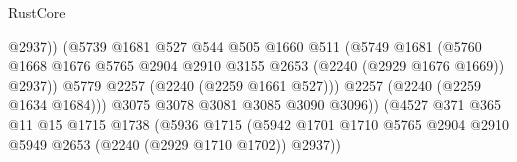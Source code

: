 \begin{lexlean}{RustCore}
\begin{coremodule}
                                                @2937))
                                            (@5739
                                              @1681
                                              @527
                                              @544
                                              @505
                                              @1660
                                              @511
                                              (@5749
                                                @1681
                                                (@5760
                                                  @1668
                                                  @1676
                                                  @5765
                                                  @2904
                                                  @2910
                                                  @3155
                                                  @2653
                                                  (@2240 (@2929 @1676 @1669))
                                                  @2937))
                                              @5779
                                              @2257
                                              (@2240 (@2259 @1661 @527)))
                                            @2257
                                            (@2240 (@2259 @1634 @1684)))
                                          @3075
                                          @3078
                                          @3081
                                          @3085
                                          @3090
                                          @3096))
                                      (@4527
                                        @371
                                        @365
                                        @11
                                        @15
                                        @1715
                                        @1738
                                        (@5936
                                          @1715
                                          (@5942
                                            @1701
                                            @1710
                                            @5765
                                            @2904
                                            @2910
                                            @5949
                                            @2653
                                            (@2240 (@2929 @1710 @1702))
                                            @2937))

\end{coremodule}
\end{lexlean}
